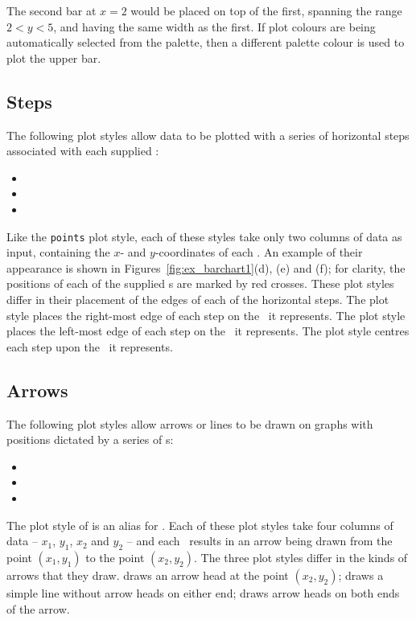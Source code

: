 \noindent The second bar at $x=2$ would be placed on top of the first, spanning
the range $2<y<5$, and having the same width as the first. If plot colours are
being automatically selected from the palette, then a different palette colour
is used to plot the upper bar.

\subsection{Steps}

The following plot styles allow data to be plotted with a series of horizontal
steps associated with each supplied \datapoint:
\begin{itemize}
\item {}
\item {}
\item {}
\end{itemize}
Like the {\tt points} plot style, each of these styles take only two columns of
data as input, containing the $x$- and $y$-coordinates of each \datapoint.  An
example of their appearance  is shown in Figures~\ref{fig:ex_barchart1}(d), (e)
and (f); for clarity, the positions of each of the supplied \datapoint s are
marked by red crosses.  These plot styles differ in their placement of the
edges of each of the horizontal steps.  The  plot style places
the right-most edge of each step on the \datapoint\ it represents.  The
 plot style places the left-most edge of each step on the
\datapoint\ it represents.  The  plot style centres each step
upon the \datapoint\ it represents.

\subsection{Arrows}

The following plot styles allow arrows or lines to be drawn on graphs with
positions dictated by a series of \datapoint s:
\begin{itemize}
\item {}
\item {}
\item {}
\end{itemize}
The plot style of  is an alias for .  Each
of these plot styles take four columns of data -- $x_1$, $y_1$, $x_2$ and $y_2$
-- and each \datapoint\ results in an arrow being drawn from the point
$(x_1,y_1)$ to the point $(x_2,y_2)$. The three plot styles differ in the kinds
of arrows that they draw.  draws an arrow head at the
point $(x_2,y_2)$;  draws a simple line without arrow
heads on either end;  draws arrow heads on both ends of
the arrow.

